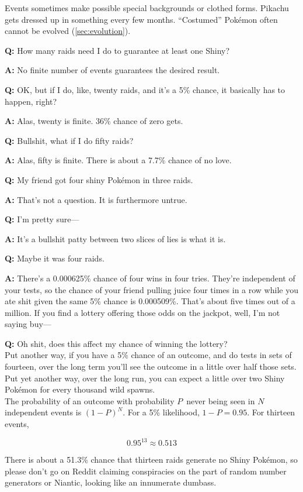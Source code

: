 Events sometimes make possible special backgrounds or clothed forms.
Pikachu gets dressed up in something every few months.
``Costumed'' Pokémon often cannot be evolved (\autoref{sec:evolution}).

\vfill
\begin{tipbox}[title=An aside regarding independent events,title style={color=Green!50!black}]
\textbf{Q:} How many raids need I do to guarantee at least one Shiny?

\textbf{A:} No finite number of events guarantees the desired result.

\textbf{Q:} OK, but if I do, like, twenty raids, and it's a 5\% chance, it basically has to happen, right?

\textbf{A:} Alas, twenty is finite. 36\% chance of zero gets.

\textbf{Q:} Bullshit, what if I do fifty raids?

\textbf{A:} Alas, fifty is finite. There is about a 7.7\% chance of no love.

\textbf{Q:} My friend got four shiny Pokémon in three raids.

\textbf{A:} That's not a question. It is furthermore untrue.

\textbf{Q:} I'm pretty sure---

\textbf{A:} It's a bullshit patty between two slices of lies is what it is.

\textbf{Q:} Maybe it was four raids.

\textbf{A:} There's a 0.000625\% chance of four wins in four tries. They're independent of your tests,
             so the chance of your friend pulling juice four times in a row while you ate shit given
             the same 5\% chance is 0.000509\%. That's about five times out of a million.
             If you find a lottery offering those odds on the jackpot, well, I'm not saying buy---

\textbf{Q:} Oh shit, does this affect my chance of winning the lottery?\\

Put another way, if you have a 5\% chance of an outcome, and do tests in sets of fourteen,
 over the long term you'll see the outcome in a little over half those sets.
Put yet another way, over the long run, you can expect a little over two Shiny
 Pokémon for every thousand wild spawns.\\

The probability of an outcome with probability $P$\, never being seen in $N$ independent
  events is ${(1 - P)}^N$. For a 5\% likelihood, $1 - P = 0.95$. For thirteen events,

  \[ 0.95^{13} ≈ 0.513 \]

There is about a 51.3\% chance that thirteen raids generate no Shiny Pokémon,
  so please don't go on Reddit claiming conspiracies on the part of
  random number generators or Niantic, looking like an innumerate dumbass.
\end{tipbox}

